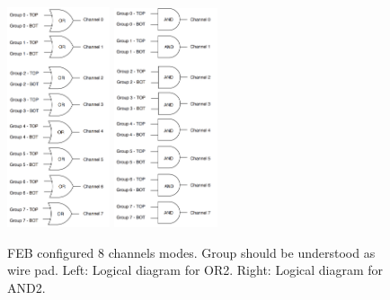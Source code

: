 \begin{figure}[!htbp]
\begin{center}
\includegraphics[width=0.27\textwidth,keepaspectratio]{figures/rpc/mwpc/or2.png}\hspace*{1.cm}
\includegraphics[width=0.27\textwidth,keepaspectratio]{figures/rpc/mwpc/and2.png}\hspace*{1.cm}
\end{center}\vspace*{-.5cm}
\caption{FEB configured 8 channels modes. Group should be understood as wire pad. Left: Logical diagram for OR2. Right: Logical diagram for AND2.}
\label{8channels}
\end{figure}


